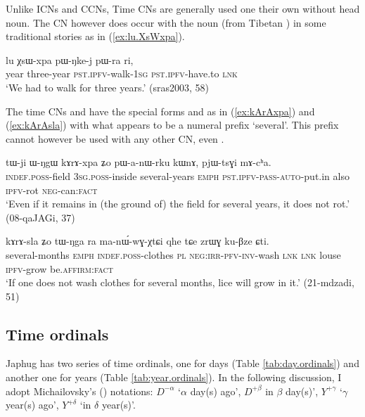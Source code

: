 Unlike ICNs and CCNs, Time CNs are generally used one their own without head noun. The CN  however does occur with the noun  (from Tibetan ) in some traditional stories as in (\ref{ex:lu.XsWxpa}).

\begin{exe}
\ex \label{ex:lu.XsWxpa}
\gll lu χsɯ-xpa pɯ-ŋke-j pɯ-ra ri, \\
year three-year \textsc{pst}.\textsc{ipfv}-walk-\textsc{1sg} \textsc{pst}.\textsc{ipfv}-have.to \textsc{lnk} \\
\glt `We had to walk for three years.' (sras2003, 58)
\end{exe} 

The time CNs  and  have the special forms  and  as in (\ref{ex:kArAxpa}) and (\ref{ex:kArAsla}) with what appears to be a numeral prefix  `several'. This prefix cannot however be used with any other CN, even . 

\begin{exe}
\ex \label{ex:kArAxpa}
\gll tɯ-ji ɯ-ŋgɯ kɤrɤ-xpa ʑo pɯ-a-nɯ-rku kɯnɤ, pjɯ-tsɣi mɤ-cʰa. \\
\textsc{indef}.\textsc{poss}-field \textsc{3sg}.\textsc{poss}-inside several-years \textsc{emph} \textsc{pst}.\textsc{ipfv}-\textsc{pass}-\textsc{auto}-put.in also \textsc{ipfv}-rot \textsc{neg}-can:\textsc{fact} \\
\glt `Even if it remains in (the ground of) the field for several years, it does not rot.' (08-qaJAGi, 37)
\end{exe}

\begin{exe}
\ex \label{ex:kArAsla}
\gll kɤrɤ-sla ʑo tɯ-ŋga ra ma-nɯ́-wɣ-χtɕi qhe tɕe zrɯɣ ku-βze ɕti.  \\
several-months \textsc{emph} \textsc{indef}.\textsc{poss}-clothes \textsc{pl} \textsc{neg}:\textsc{irr}-\textsc{pfv}-\textsc{inv}-wash \textsc{lnk} \textsc{lnk} louse \textsc{ipfv}-grow be.\textsc{affirm}:\textsc{fact} \\
\glt `If one does not wash clothes for several months, lice will grow in it.' (21-mdzadi, 51)
\end{exe}


\subsection{Time ordinals} \label{sec:time.ordinals}
Japhug has two series of time ordinals, one for days (Table \ref{tab:day.ordinals}) and another one for years (Table \ref{tab:year.ordinals}).  In the following discussion, I adopt Michailovsky's (\citeyear{michailovsky03ordinals}) notations: $D^{-\alpha}$ `$\alpha$ day(s) ago', $D^{+\beta}$ in $\beta$ day(s)', $Y^{+ \gamma}$ `$\gamma$ year(s) ago', $Y^{+ \delta}$  `in $\delta$ year(s)'.

